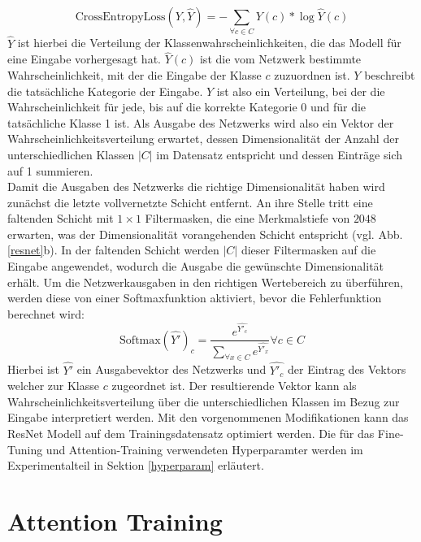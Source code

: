 \begin{equation}
\text{CrossEntropyLoss}(Y,\hat{Y}) = -\sum_{\forall c \in C}{Y(c)*\log\hat{Y}(c)}
\end{equation}
$\hat{Y}$ ist hierbei die Verteilung der Klassenwahrscheinlichkeiten, die das Modell für eine Eingabe vorhergesagt hat. $\hat{Y}(c)$ ist die vom Netzwerk bestimmte Wahrscheinlichkeit, mit der die Eingabe der Klasse $c$ zuzuordnen ist. $Y$ beschreibt die tatsächliche Kategorie der Eingabe. $Y$ ist also ein Verteilung, bei der die Wahrscheinlichkeit für jede, bis auf die korrekte Kategorie 0 und für die tatsächliche Klasse 1 ist. Als Ausgabe des Netzwerks wird also ein Vektor der Wahrscheinlichkeitsverteilung erwartet, dessen Dimensionalität der Anzahl der unterschiedlichen Klassen $|C|$ im Datensatz entspricht und dessen Einträge sich auf 1 summieren. \\
Damit die Ausgaben des Netzwerks die richtige Dimensionalität haben wird zunächst die letzte vollvernetzte Schicht entfernt. An ihre Stelle tritt eine faltenden Schicht mit $1\times1$ Filtermasken, die eine Merkmalstiefe von $2048$ erwarten, was der Dimensionalität vorangehenden Schicht entspricht (vgl. Abb. \ref{resnet}b). In der faltenden Schicht werden $|C|$ dieser Filtermasken auf die Eingabe angewendet, wodurch die Ausgabe die gewünschte Dimensionalität erhält.
Um die Netzwerkausgaben in den richtigen Wertebereich zu überführen, werden diese von einer Softmaxfunktion aktiviert, bevor die Fehlerfunktion berechnet wird:
\begin{equation}
\text{Softmax}(\hat{Y'})_{c} = \frac{e^{\hat{Y'_c}}}{\sum_{\forall x \in C}{e^{\hat{Y'_x}}}} \forall c \in C
\end{equation}
Hierbei ist $\hat{Y'}$ ein Ausgabevektor des Netzwerks und $\hat{Y'_c}$ der Eintrag des Vektors welcher zur Klasse $c$ zugeordnet ist. Der resultierende Vektor kann als Wahrscheinlichkeitsverteilung über die unterschiedlichen Klassen im Bezug zur Eingabe interpretiert werden. Mit den vorgenommenen Modifikationen kann das ResNet Modell auf dem Trainingsdatensatz optimiert werden. Die für das Fine-Tuning und Attention-Training verwendeten Hyperparamter werden im Experimentalteil in Sektion \ref{hyperparam} erläutert.

\section{Attention Training}


